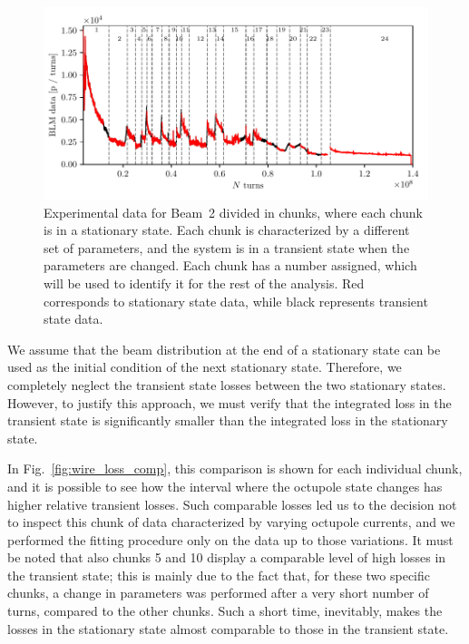 \begin{figure}[th]
    \centering
    \includegraphics[width=1.0\textwidth]{5_wire_compensators_LHC/figs/chunks_names.pdf}
    \caption{Experimental data for Beam~2 divided in chunks, where each chunk is in a stationary state. Each chunk is characterized by a different set of parameters, and the system is in a transient state when the parameters are changed. Each chunk has a number assigned, which will be used to identify it for the rest of the analysis. Red corresponds to stationary state data, while black represents transient state data.}
    \label{fig:chunks}
\end{figure}

We assume that the beam distribution at the end of a stationary state can be used as the initial condition of the next stationary state. Therefore, we completely neglect the transient state losses between the two stationary states. However, to justify this approach, we must verify that the integrated loss in the transient state is significantly smaller than the integrated loss in the stationary state.

In Fig.~\ref{fig:wire_loss_comp}, this comparison is shown for each individual chunk, and it is possible to see how the interval where the octupole state changes has higher relative transient losses. Such comparable losses led us to the decision not to inspect this chunk of data characterized by varying octupole currents, and we performed the fitting procedure only on the data up to those variations. It must be noted that also chunks 5 and 10 display a comparable level of high losses in the transient state; this is mainly due to the fact that, for these two specific chunks, a change in parameters was performed after a very short number of turns, compared to the other chunks. Such a short time, inevitably, makes the losses in the stationary state almost comparable to those in the transient state. 

